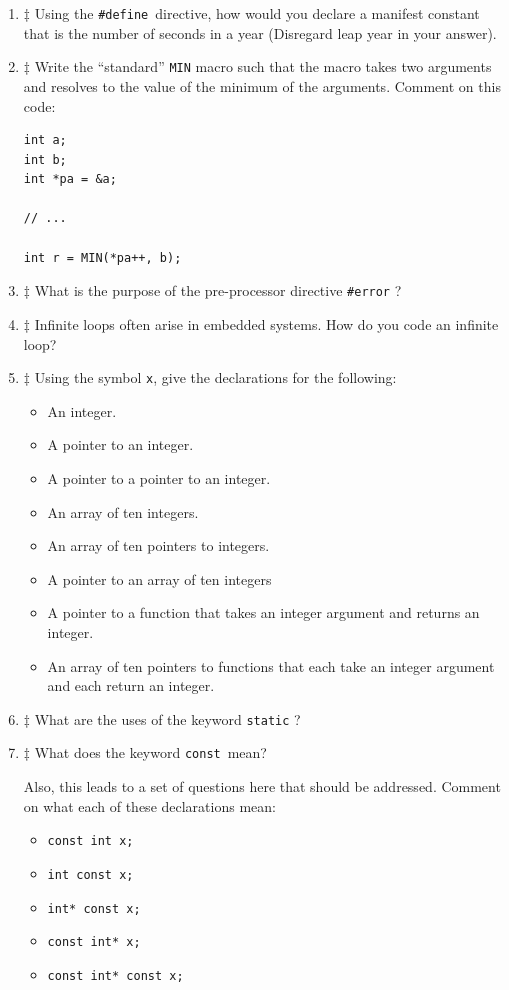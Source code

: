 \documentclass[12pt]{article}
\newcommand{\cdefine}{{\texttt{\#define}}}%
\newcommand{\cconst}{{\texttt{const}}}%
\begin{document}
\begin{enumerate}

\item $\ddagger$ Using the \cdefine\ directive, how would you declare a manifest
constant that is the number of seconds in a year (Disregard leap year in your
answer).
\par

\item $\ddagger$ Write the ``standard'' {\texttt{MIN}} macro such that the macro takes two arguments
and resolves to the value of the minimum of the arguments.
\newpage
Comment on this code:
\begin{lstlisting}
int a;
int b;
int *pa = &a;

// ...

int r = MIN(*pa++, b);

\end{lstlisting}

\item $\ddagger$ What is the purpose of the pre-processor directive {\texttt{\#error}} ?


\item $\ddagger$ Infinite loops often arise in embedded systems. How do you code an infinite loop?


\item $\ddagger$ Using the symbol {\texttt{x}}, give the declarations for the following:
\begin{itemize}
\item An integer.
\item A pointer to an integer.
\item A pointer to a pointer to an integer.
\item An array of ten integers.
\item An array of ten pointers to integers.
\item A pointer to an array of ten integers
\item A pointer to a function that takes an integer argument  and returns an integer.
\item An array of ten pointers to functions that each take an integer argument and each return an integer.
\end{itemize}

\item $\ddagger$ What are the uses of the keyword {\texttt{static}} ?


\item $\ddagger$ What does the keyword \cconst\  mean?

Also, this leads to a set of questions here that should be addressed.
Comment on what each of these declarations mean:

\begin{itemize}
\item  {\texttt{const int x;}}
\item {\texttt{int const x;}}
\item {\texttt{int* const x;}}
\item {\texttt{const int* x;}}
\item {\texttt{const int* const x;}}
\end{itemize}

\end{enumerate}
\end{document}
